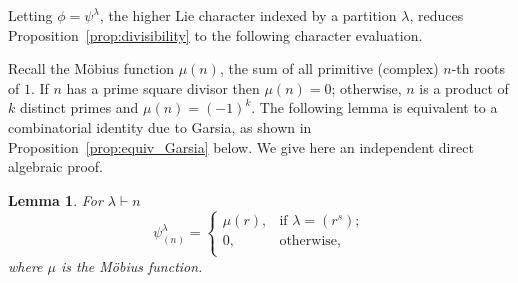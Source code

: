 \documentclass[10pt]{article}
\newtheorem{lemma}[theorem]{Lemma}
\theoremstyle{definition}
\begin{document}
Letting $\phi = \psi^\lambda$, the higher Lie character indexed by a partition $\lambda$, reduces Proposition~\ref{prop:divisibility} to the following character evaluation. 

Recall the M\"obius function $\mu(n)$, the sum of all primitive (complex) $n$-th roots of $1$. If $n$ has a prime square divisor then $\mu(n)=0$; otherwise, $n$ is a product of $k$ distinct primes and $\mu(n)=(-1)^k$. 
The following lemma is equivalent to a combinatorial identity due to Garsia, as shown in  Proposition~\ref{prop:equiv_Garsia} below. We give here an independent direct algebraic proof.

\begin{lemma}\label{lem:char_eval_cycles}
    For $\lambda \vdash n$
    \[
        \psi^\lambda_{(n)} =
        \begin{cases} 
            \mu(r), &\text{if } \lambda = (r^s);\\
	       0, &\text{otherwise,}\\
        \end{cases}
    \]
    where $\mu$ is the M\"obius function.
\end{lemma}
\end{document}
